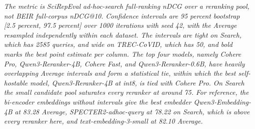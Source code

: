 \begin{table}[H]
\vspace{3pt}
\begin{minipage}{\linewidth}
\footnotesize\itshape
The metric is SciRepEval ad-hoc-search full-ranking nDCG over a reranking pool, not BEIR full-corpus nDCG@10. Confidence intervals are 95 percent bootstrap [2.5 percent, 97.5 percent] over 1000 iterations with seed 42, with the Average resampled independently within each dataset. The intervals are tight on Search, which has 2585 queries, and wide on TREC-CoVID, which has 50, and bold marks the best point estimate per column. The top four models, namely Cohere Pro, Qwen3-Reranker-4B, Cohere Fast, and Qwen3-Reranker-0.6B, have heavily overlapping Average intervals and form a statistical tie, within which the best self-hostable model, Qwen3-Reranker-4B at int8, is tied with Cohere Pro. On Search the small candidate pool saturates every reranker at around 75. For reference, the bi-encoder embeddings without intervals give the best embedder Qwen3-Embedding-4B at 83.28 Average, SPECTER2-adhoc-query at 78.22 on Search, which is above every reranker here, and text-embedding-3-small at 82.10 Average.
\end{minipage}
\end{table}


%
%

